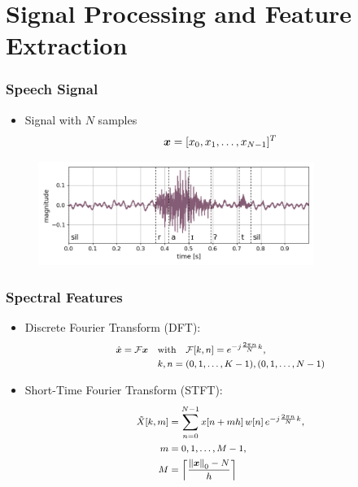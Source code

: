 
\section{Signal Processing and Feature Extraction}
\begin{frame}
  \frametitle{Speech Signal}
  \begin{itemize}
    \item Signal with $N$ samples
    \begin{equation*}\label{eq:signal_raw_x}
      \footnotesize
      \bm{x} = [x_0, x_1, \dots, x_{N-1}]^T
    \end{equation*}
  \end{itemize}
  \begin{figure} \includegraphics[width=0.8\textwidth]{../3_signal/figs/signal_raw_showcase_right0.png} \end{figure}
\end{frame}

\begin{frame}
  \frametitle{Spectral Features}
  \vspace{-0.5cm}
  \begin{itemize}
    \item Discrete Fourier Transform (DFT):
    \begin{equation*}\label{eq:signal_spec_dtft_matrix}
      \footnotesize
      \begin{aligned}
        \hat{\bm{x}} = \mathcal{F} \bm{x} \quad & \mathrm{with} 
        \quad \mathcal{F}[k, n] = e^{-j\frac{2 \pi n}{N} k},\\
        &k, n = (0, 1, \dots, K-1), (0, 1, \dots, N-1)
      \end{aligned}
    \end{equation*}

    \item Short-Time Fourier Transform (STFT):
    \begin{equation*}\label{eq:signal_spec_stft}
      \footnotesize
      \begin{aligned}
        \tilde{X}[k, m] &= \sum_{n=0}^{N-1} x[n + m h] \, w[n] \, e^{-j\frac{2 \pi n}{N}k},\\ 
        m &= 0, 1, \dots, M - 1,\\
        M &= \ceil*{\frac{\norm{\bm{x}}_0-N}{h}}
      \end{aligned}
    \end{equation*}
  \end{itemize}
\end{frame}

